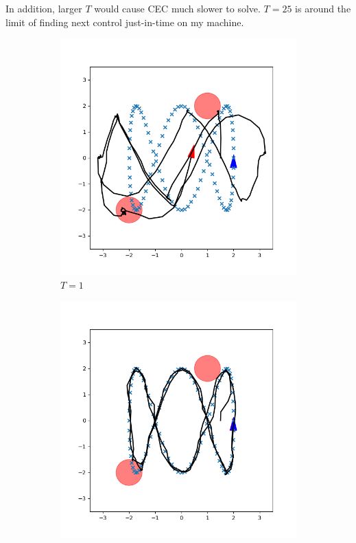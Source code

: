 \documentclass[conference]{IEEEtran}
\begin{document}
In addition, larger $T$ would cause CEC much slower to solve. 
$T=25$ is around the limit of finding next control just-in-time on my machine.

\begin{figure}[h]
    \centering
    \begin{subfigure}[b]{0.3\textwidth}
        \includegraphics[width=\textwidth]{../fig/trajectory.cec.T_1.png}
        \caption{$T=1$}
        \label{fig:T1}
    \end{subfigure}
    \hfill
    \begin{subfigure}[b]{0.3\textwidth}
        \includegraphics[width=\textwidth]{../fig/trajectory.cec.png}

\end{subfigure}
\end{figure}
\end{document}
